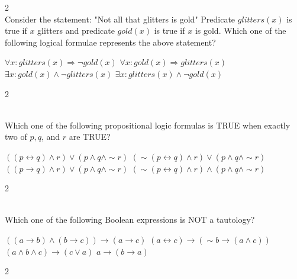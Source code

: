 \documentclass[12pt]{exam}
\begin{document}
\begin{questions}
\begin{multicols*}{2}
 \\[0.2cm]
{\Large Consider the statement:\newline
"Not all that glitters is gold"\newline
Predicate $glitters(x)$ is true if $x$ glitters and predicate $gold(x)$ is true if $x$ is gold. Which one of the following logical formulae represents the above statement?}
\begin{choices}
  \choice $\forall x: glitters(x) \Rightarrow \neg gold(x)$
  \choice $\forall x: gold(x) \Rightarrow glitters(x)$
  \choice $\exists x: gold(x) \wedge \neg glitters(x)$
  \choice $\exists x: glitters(x) \wedge \neg gold(x)$
\end{choices}

\end{multicols*}
\vspace{0.6cm}
\newpage
\begin{multicols*}{2}

 \\[0.2cm]
{\Large Which one of the following propositional logic formulas is TRUE when exactly two of $p, q$, and $r$ are TRUE?}
\begin{choices}
  \choice $((p \leftrightarrow q) \wedge r) \vee (p \wedge q \wedge \sim r)$
  \choice $(\sim(p \leftrightarrow q) \wedge r) \vee (p \wedge q \wedge \sim r)$
  \choice $((p \rightarrow q) \wedge r) \vee (p \wedge q \wedge \sim r)$
  \choice $(\sim(p \leftrightarrow q) \wedge r) \wedge (p \wedge q \wedge \sim r)$
\end{choices}

\end{multicols*}
\vspace{0.6cm}
\newpage
\begin{multicols*}{2}

 \\[0.2cm]
{\Large Which one of the following Boolean expressions is NOT a tautology?}
\begin{choices}
  \choice $((a \rightarrow b) \wedge (b \rightarrow c)) \rightarrow (a \rightarrow c)$
  \choice $(a \leftrightarrow c) \rightarrow (\sim b \rightarrow (a \wedge c))$
  \choice $(a \wedge b \wedge c) \rightarrow (c \vee a)$
  \choice $a \rightarrow (b \rightarrow a)$
\end{choices}

\end{multicols*}
\vspace{0.6cm}
\newpage
\begin{multicols*}{2}


\end{multicols*}
\end{questions}
\end{document}
